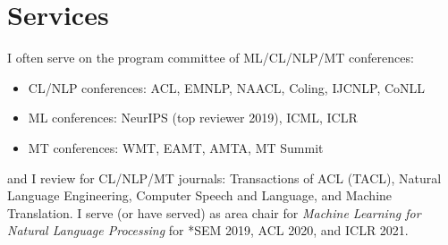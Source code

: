 

\section*{Services}

I often serve on the program committee of ML/CL/NLP/MT conferences:
\begin{itemize}\setlength\itemsep{0pt}
	\item CL/NLP conferences: ACL, EMNLP, NAACL, Coling, IJCNLP, CoNLL
	\item ML conferences: NeurIPS (top reviewer 2019), ICML, ICLR
	\item MT conferences: WMT, EAMT, AMTA, MT Summit
\end{itemize}
and I review for CL/NLP/MT journals: Transactions of ACL (TACL), Natural Language Engineering, Computer Speech and Language, and Machine Translation. I serve (or have served) as area chair for \emph{Machine Learning for Natural Language Processing} for *SEM 2019, ACL 2020, and ICLR 2021.


